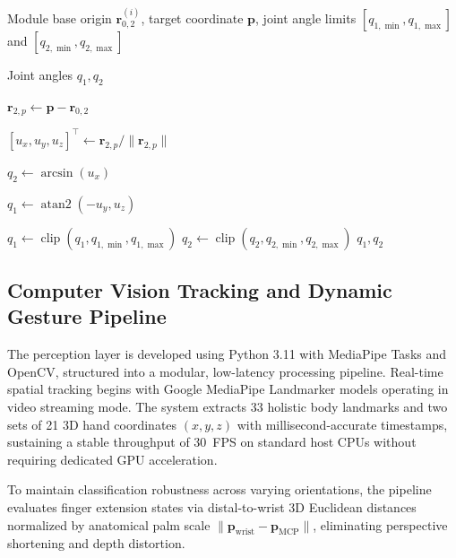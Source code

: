 \documentclass[lettersize,journal]{IEEEtran}
\begin{document}
	\begin{algorithm}[b]
		\caption{SOFIA Module Inverse Kinematics}
		\label{alg:sofia_ik}
		
		\begin{algorithmic}[1]
			
			\Require Module base origin $\mathbf{r}_{0,2}^{(i)}$, target coordinate
			$\mathbf{p}$, joint angle limits
			$[q_{1,\min},q_{1,\max}]$ and
			$[q_{2,\min},q_{2,\max}]$
			
			\Ensure Joint angles $q_1,q_2$
			
			\State $\mathbf{r}_{2,p} \gets \mathbf{p} - \mathbf{r}_{0,2}$
			
			\State $[u_x,u_y,u_z]^\top \gets
			\mathbf{r}_{2,p}/\lVert\mathbf{r}_{2,p}\rVert$
			
			\State $q_2 \gets \arcsin(u_x)$
			
			\State $q_1 \gets \operatorname{atan2}(-u_y,u_z)$
			
			\State $q_1 \gets \operatorname{clip}(q_1, q_{1,\min}, q_{1,\max})$
			\State $q_2 \gets \operatorname{clip}(q_2, q_{2,\min}, q_{2,\max})$
			\State \Return $q_1,q_2$
			
		\end{algorithmic}
	\end{algorithm}
	
	
	\subsection{Computer Vision Tracking and Dynamic Gesture Pipeline}
	\label{sec:vision_pipeline}
	
	The perception layer is developed using Python 3.11 with MediaPipe Tasks and OpenCV, structured into a modular, low-latency processing pipeline. Real-time spatial tracking begins with Google MediaPipe Landmarker models operating in video streaming mode. The system extracts 33 holistic body landmarks and two sets of 21 3D hand coordinates $(x, y, z)$ with millisecond-accurate timestamps, sustaining a stable throughput of 30~FPS on standard host CPUs without requiring dedicated GPU acceleration.
	
	To maintain classification robustness across varying orientations, the pipeline evaluates finger extension states via distal-to-wrist 3D Euclidean distances normalized by anatomical palm scale $\lVert \mathbf{p}_{\text{wrist}} - \mathbf{p}_{\text{MCP}} \rVert$, eliminating perspective shortening and depth distortion.
	
\end{document}
